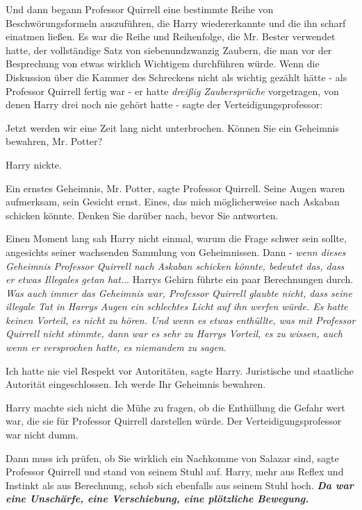 Und dann begann Professor Quirrell eine bestimmte Reihe von Beschwörungsformeln
auszuführen, die Harry wiedererkannte und die ihn scharf einatmen ließen. Es war
die Reihe und Reihenfolge, die Mr. Bester verwendet hatte, der vollständige Satz
von siebenundzwanzig Zaubern, die man vor der Besprechung von etwas wirklich
Wichtigem durchführen würde. Wenn die Diskussion über die Kammer des Schreckens
nicht als wichtig gezählt hätte - als Professor Quirrell fertig war - er hatte
\emph{dreißig Zaubersprüche} vorgetragen, von denen Harry drei noch nie gehört
hatte - sagte der Verteidigungsprofessor:

\glqq{}Jetzt werden wir eine Zeit lang nicht unterbrochen. Können Sie ein
Geheimnis bewahren, Mr. Potter?\grqq{}

Harry nickte.

\glqq{}Ein ernstes Geheimnis, Mr. Potter\grqq{}, sagte Professor Quirrell. Seine
Augen waren aufmerksam, sein Gesicht ernst. \glqq{}Eines, das mich möglicherweise
nach Askaban schicken könnte. Denken Sie darüber nach, bevor Sie antworten.\grqq{}

Einen Moment lang sah Harry nicht einmal, warum die Frage schwer sein sollte,
angesichts seiner wachsenden Sammlung von Geheimnissen. Dann - \emph{wenn dieses
Geheimnis Professor Quirrell nach Askaban schicken könnte, bedeutet das, dass er
etwas Illegales getan hat.}.. Harrys Gehirn führte ein paar Berechnungen durch.
\emph{Was auch immer das Geheimnis war, Professor Quirrell glaubte nicht, dass
seine illegale Tat in Harrys Augen ein schlechtes Licht auf ihn werfen würde. Es
hatte keinen Vorteil, es nicht zu hören. Und wenn es etwas enthüllte, was mit
Professor Quirrell nicht stimmte, dann war es sehr zu Harrys Vorteil, es zu
wissen, auch wenn er versprochen hatte, es niemandem zu sagen.}

\glqq{}Ich hatte nie viel Respekt vor Autoritäten\grqq{}, sagte Harry. \glqq{}
Juristische und staatliche Autorität eingeschlossen. Ich werde Ihr Geheimnis
bewahren.\grqq{}

Harry machte sich nicht die Mühe zu fragen, ob die Enthüllung die Gefahr wert
war, die sie für Professor Quirrell darstellen würde. Der Verteidigungsprofessor
war nicht dumm.

\glqq{}Dann muss ich prüfen, ob Sie wirklich ein Nachkomme von Salazar
sind\grqq{}, sagte Professor Quirrell und stand von seinem Stuhl auf. Harry,
mehr aus Reflex und Instinkt als aus Berechnung, schob sich ebenfalls aus seinem
Stuhl hoch. \textbf{\emph{ Da war eine Unschärfe, eine Verschiebung, eine
plötzliche Bewegung.} }

